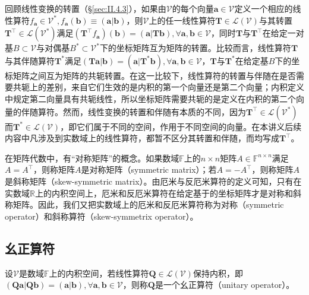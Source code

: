 \documentclass[main.tex]{subfiles}
\begin{document}
回顾线性变换的转置（\S\ref{sec:II.4.3}），如果由$\mathcal{V}$的每个向量$\mathbf{a}\in\mathcal{V}$定义一个相应的线性算符$f_\mathbf{a}\in\mathcal{V}^*,f_\mathbf{a}\left(\mathbf{b}\right)\equiv\left(\mathbf{a}|\mathbf{b}\right)$，则$\mathcal{V}$上的任一线性算符$\mathbf{T}\in\mathcal{L}\left(\mathcal{V}\right)$与其转置$\mathbf{T}^\intercal\in\mathcal{L}\left(\mathcal{V}^*\right)$满足$\left(\mathbf{T}^\intercal f_\mathbf{a}\right)\left(\mathbf{b}\right)=\left(\mathbf{a}|\mathbf{Tb}\right),\forall\mathbf{a},\mathbf{b}\in\mathcal{V}$，同时$\mathbf{T}$与$\mathbf{T}^\intercal$在给定一对基$B\subset\mathcal{V}$与对偶基$B^*\subset\mathcal{V}^*$下的坐标矩阵互为矩阵的转置。比较而言，线性算符$\mathbf{T}$与其伴随算符$\mathbf{T}^*$满足$\left(\mathbf{Ta}|\mathbf{b}\right)=\left(\mathbf{a}|\mathbf{T}^*\mathbf{b}\right),\forall\mathbf{a},\mathbf{b}\in\mathcal{V}$，$\mathbf{T}$与$\mathbf{T}^*$在给定基$B$下的坐标矩阵之间互为矩阵的共轭转置。在这一比较下，线性算符的转置与伴随在是否需要共轭上的差别，来自它们生效的是内积的第一个向量还是第二个向量；内积定义中规定第二向量具有共轭线性，所以坐标矩阵需要共轭的是定义在内积的第二个向量的伴随算符。然而，线性变换的转置和伴随有本质的不同，因为$\mathbf{T}^\intercal\in\mathcal{L}\left(\mathcal{V}^*\right)$而$\mathbf{T}^*\in\mathcal{L}\left(\mathcal{V}\right)$，即它们属于不同的空间，作用于不同空间的向量。在本讲义后续内容中凡涉及到实数域上的线性算符，都暂不区分其转置和伴随，而均写成$\mathbf{T}^\intercal$。

在矩阵代数中，有“对称矩阵”的概念。如果数域$\mathbb{F}$上的$n\times n$矩阵$A\in\mathbb{F}^{n\times n}$满足$A=A^\intercal$，则称矩阵$A$是对称矩阵（symmetric matrix）；若$A=-A^\intercal$，则称矩阵$A$是斜称矩阵（skew-symmetric matrix）。由厄米与反厄米算符的定义可知，只有在实数域$\mathbb{R}$上的内积空间上，厄米和反厄米算符在给定基于的坐标矩阵才是对称和斜称矩阵。因此，我们又把实数域上的厄米和反厄米算符称为对称（symmetric operator）和斜称算符（skew-symmetrix operator）。

\subsection{幺正算符}

\begin{definition}[幺正算符]\label{def:II.6.2}
    设$\mathcal{V}$是数域$\mathbb{F}$上的内积空间，若线性算符$\mathbf{Q}\in\mathcal{L}\left(\mathcal{V}\right)$保持内积，即$\left(\mathbf{Qa}|\mathbf{Qb}\right)=\left(\mathbf{a}|\mathbf{b}\right),\forall\mathbf{a},\mathbf{b}\in\mathcal{V}$，则称$\mathbf{Q}$是一个幺正算符（unitary operator）。
\end{definition}
\end{document}
